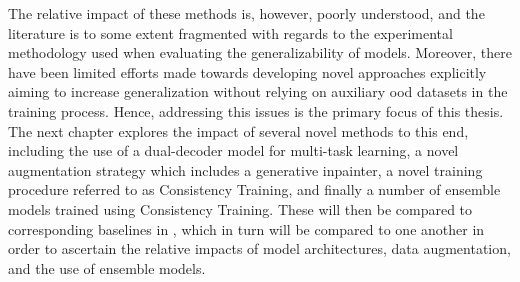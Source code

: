 The relative impact of these methods is, however, poorly understood, and the literature is to some extent fragmented with regards to the experimental methodology used when evaluating the generalizability of models. Moreover, there have been limited efforts made towards developing novel approaches explicitly aiming to increase generalization without relying on auxiliary \gls{ood} datasets in the training process. Hence, addressing this issues is the primary focus of this thesis. The next chapter explores the impact of several novel methods to this end, including the use of a dual-decoder model for multi-task learning, a novel augmentation strategy which includes a generative inpainter, a novel training procedure referred to as Consistency Training, and finally a number of ensemble models trained using Consistency Training. These will then be compared to corresponding baselines in , which in turn will be compared to one another in order to ascertain the relative impacts of model architectures, data augmentation, and the use of ensemble models. 


